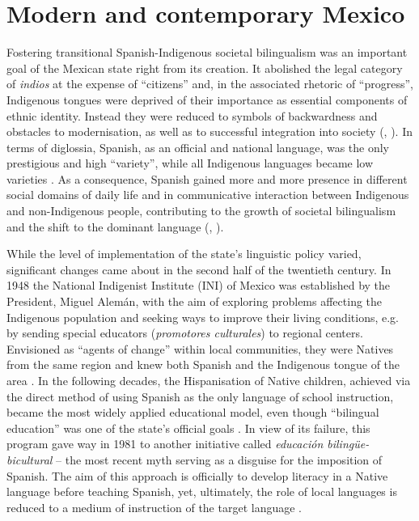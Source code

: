 \documentclass[output=paper,hidelinks]{langscibook}
\begin{document}
\section{Modern and contemporary Mexico}

Fostering transitional Spanish-Indigenous societal bilingualism was an important goal of the Mexican state right from its creation. It abolished the legal category of \textit{indios} at the expense of ``citizens'' and, in the associated rhetoric of ``progress'', Indigenous tongues were deprived of their importance as essential components of ethnic identity. Instead they were reduced to symbols of backwardness and obstacles to modernisation, as well as to successful integration into society (\citealt[62--64]{heath1972}, \citealt[582--583]{estradafernandez2010}). In terms of diglossia, Spanish, as an official and national language, was the only prestigious and high ``variety'', while all Indigenous languages became low varieties \citep[911]{zimmermann2010}. As a consequence, Spanish gained more and more presence in different social domains of daily life and in communicative interaction between Indigenous and non-Indigenous people, contributing to the growth of societal bilingualism and the shift to the dominant language (\citealt[723--730]{villavicenciozarza2010}, \citealt[92--93]{gonzalezluna2012}).

While the level of implementation of the state’s linguistic policy varied, significant changes came about in the second half of the twentieth century. In 1948 the National Indigenist Institute (INI) of Mexico was established by the President, Miguel Alemán, with the aim of exploring problems affecting the Indigenous population and seeking ways to improve their living conditions, e.g. by sending special educators (\textit{promotores culturales}) to regional centers. Envisioned as ``agents of change'' within local communities, they were Natives from the same region and knew both Spanish and the Indigenous tongue of the area \citep[135--138]{heath1972}. In the following decades, the Hispanisation of Native children, achieved via the direct method of using Spanish as the only language of school instruction, became the most widely applied educational model, even though ``bilingual education'' was one of the state’s official goals \citep[162--163]{heath1972}. In view of its failure, this program gave way in 1981 to another initiative called \textit{educación bilingüe-bicultural} – the most recent myth serving as a disguise for the imposition of Spanish. The aim of this approach is officially to develop literacy in a Native language before teaching Spanish, yet, ultimately, the role of local languages is reduced to a medium of instruction of the target language \citep[40--41]{floresfarfan1999}.
\end{document}
